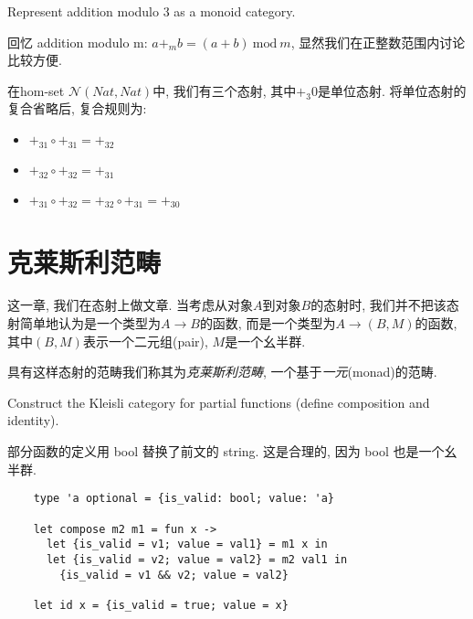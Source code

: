 \documentclass[lang=cn]{elegantbook}
\begin{document}
\begin{exercise}
Represent addition modulo 3 as a monoid category.
\end{exercise}

\begin{solution}

回忆 addition modulo m: $a+_m b = (a + b)\ \text{mod}\ m$, 显然我们在正整数范围内讨论比较方便.


在hom-set $\mathcal{N}(Nat, Nat)$中, 我们有三个态射, 其中$+_3 0$是单位态射. 将单位态射的复合省略后, 复合规则为:
\begin{itemize}
    \item $+_31 \circ +_31 = +_32$
    \item $+_32\circ+_32 = +_31$
    \item $+_31 \circ +_32 = +_32 \circ +_31 = +_30$
\end{itemize}

\end{solution}

\chapter{克莱斯利范畴}

这一章, 我们在态射上做文章. 当考虑从对象$A$到对象$B$的态射时, 我们并不把该态射简单地认为是一个类型为$A\rightarrow B$的函数, 而是一个类型为$A \rightarrow (B, M)$的函数, 其中$(B, M)$表示一个二元组(pair), $M$是一个幺半群.

具有这样态射的范畴我们称其为\emph{克莱斯利范畴}, 一个基于\emph{一元}(monad)的范畴.

\begin{exercise}
Construct the Kleisli category for partial functions (define composition and identity).
\end{exercise}

\begin{solution}

部分函数的定义用 bool 替换了前文的 string. 这是合理的, 因为 bool 也是一个幺半群.

\begin{verbatim}
    type 'a optional = {is_valid: bool; value: 'a}

    let compose m2 m1 = fun x ->
      let {is_valid = v1; value = val1} = m1 x in
      let {is_valid = v2; value = val2} = m2 val1 in
        {is_valid = v1 && v2; value = val2}

    let id x = {is_valid = true; value = x}
\end{verbatim}

\end{solution}
\end{document}
